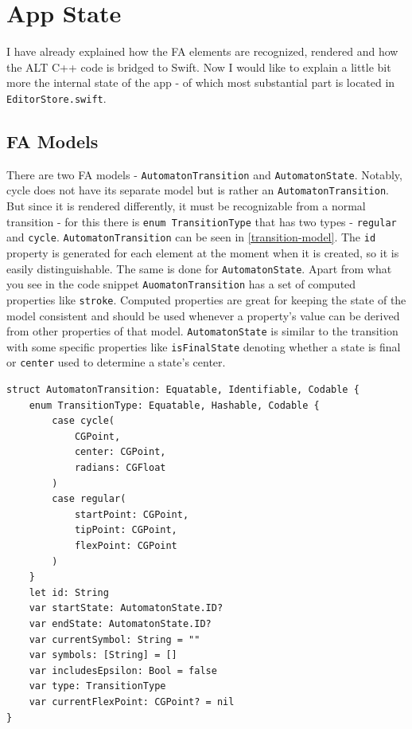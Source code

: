 \section{App State}

I have already explained how the FA elements are recognized, rendered and how the ALT C++ code is bridged to Swift. Now I would like to explain a little bit more the internal state of the app - of which most substantial part is located in \lstinline{EditorStore.swift}.

\subsection{FA Models}

There are two FA models - \lstinline{AutomatonTransition} and \lstinline{AutomatonState}. Notably, cycle does not have its separate model but is rather an \lstinline{AutomatonTransition}. But since it is rendered differently, it must be recognizable from a normal transition - for this there is \lstinline{enum TransitionType} that has two types - \lstinline{regular} and \lstinline{cycle}. \lstinline{AutomatonTransition} can be seen in \ref{transition-model}. The \lstinline{id} property is generated for each element at the moment when it is created, so it is easily distinguishable. The same is done for \lstinline{AutomatonState}.  Apart from what you see in the code snippet \lstinline{AuomatonTransition} has a set of computed properties like \lstinline{stroke}. Computed properties are great for keeping the state of the model consistent and should be used whenever a property's value can be derived from other properties of that model. \lstinline{AutomatonState} is similar to the transition with some specific properties like \lstinline{isFinalState} denoting whether a state is final or \lstinline{center} used to determine a state's center.

\begin{lstlisting}[caption={Transition model}, label=transition-model]
struct AutomatonTransition: Equatable, Identifiable, Codable {
    enum TransitionType: Equatable, Hashable, Codable {
        case cycle(
            CGPoint, 
            center: CGPoint, 
            radians: CGFloat
        )
        case regular(
            startPoint: CGPoint, 
            tipPoint: CGPoint, 
            flexPoint: CGPoint
        )
    }
    let id: String
    var startState: AutomatonState.ID?
    var endState: AutomatonState.ID?
    var currentSymbol: String = ""
    var symbols: [String] = []
    var includesEpsilon: Bool = false
    var type: TransitionType
    var currentFlexPoint: CGPoint? = nil
}
\end{lstlisting}

